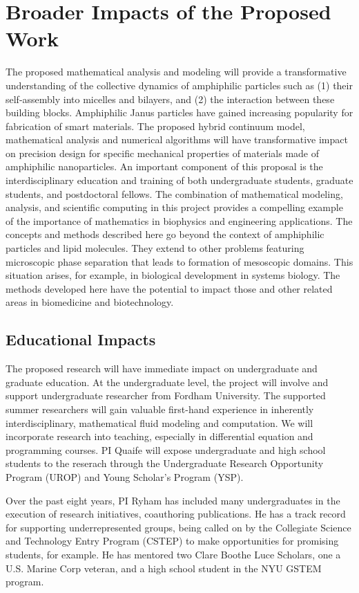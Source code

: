 \section{Broader Impacts of the Proposed Work}
\label{sec:BroaderImpacts}

The proposed mathematical analysis and modeling will provide a
transformative understanding of the collective dynamics of amphiphilic
particles such as (1) their self-assembly into micelles and bilayers,
and (2) the interaction between these building blocks. Amphiphilic Janus
particles have gained increasing popularity for fabrication of smart
materials. The proposed hybrid continuum model, mathematical analysis
and numerical algorithms will have transformative impact on precision
design for specific mechanical properties of materials made of
amphiphilic nanoparticles. An important component of this proposal is
the interdisciplinary education and training of both undergraduate
students, graduate students, and postdoctoral fellows. The combination
of mathematical modeling, analysis, and scientific computing in this
project provides a compelling example of the importance of mathematics
in biophysics and engineering applications. The concepts and methods
described here go beyond the context of amphiphilic particles and lipid
molecules. They extend to other problems featuring microscopic phase
separation that leads to formation of mesoscopic domains. This situation
arises, for example, in biological development in systems biology. The
methods developed here have the potential to impact those and other
related areas in biomedicine and biotechnology.

\subsection{Educational Impacts}
\label{subsec:Educational_plans}
The proposed research will have immediate impact on undergraduate and
graduate education. At the undergraduate level, the project will involve
and support undergraduate researcher from Fordham University. The
supported summer researchers will gain valuable first-hand experience in
inherently interdisciplinary, mathematical fluid modeling and
computation. We will incorporate research into teaching, especially in
differential equation and programming courses. PI Quaife will expose
undergraduate and high school students to the reserach through the
Undergraduate Research Opportunity Program (UROP) and Young Scholar's
Program (YSP).

Over the past eight years, PI Ryham has included many undergraduates in
the execution of research initiatives, coauthoring publications. He has
a track record for supporting underrepresented groups, being called on
by the Collegiate Science and Technology Entry Program (CSTEP) to make
opportunities for promising students, for example. He has mentored two
Clare Boothe Luce Scholars, one a U.S. Marine Corp veteran, and a high
school student in the NYU GSTEM program. 

